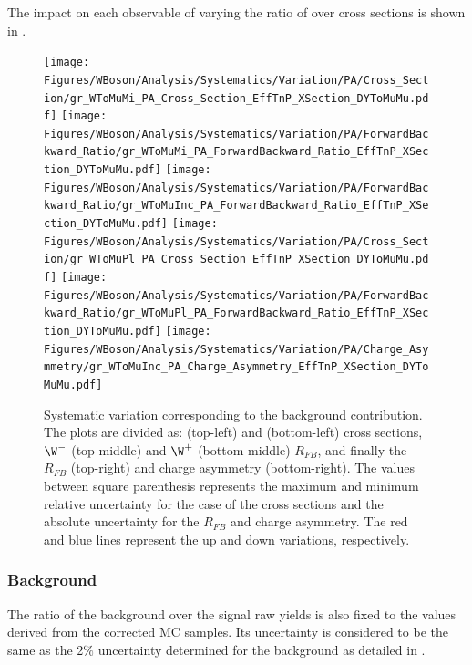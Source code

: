 The impact on each observable of varying the ratio of \DYToMuMu over \WToMuNu cross sections is shown in .

\begin{figure}[htbp]
 \begin{center}
  \texttt{[image: Figures/WBoson/Analysis/Systematics/Variation/PA/Cross\_Section/gr\_WToMuMi\_PA\_Cross\_Section\_EffTnP\_XSection\_DYToMuMu.pdf]}
  \texttt{[image: Figures/WBoson/Analysis/Systematics/Variation/PA/ForwardBackward\_Ratio/gr\_WToMuMi\_PA\_ForwardBackward\_Ratio\_EffTnP\_XSection\_DYToMuMu.pdf]}
  \texttt{[image: Figures/WBoson/Analysis/Systematics/Variation/PA/ForwardBackward\_Ratio/gr\_WToMuInc\_PA\_ForwardBackward\_Ratio\_EffTnP\_XSection\_DYToMuMu.pdf]}
  \texttt{[image: Figures/WBoson/Analysis/Systematics/Variation/PA/Cross\_Section/gr\_WToMuPl\_PA\_Cross\_Section\_EffTnP\_XSection\_DYToMuMu.pdf]}
  \texttt{[image: Figures/WBoson/Analysis/Systematics/Variation/PA/ForwardBackward\_Ratio/gr\_WToMuPl\_PA\_ForwardBackward\_Ratio\_EffTnP\_XSection\_DYToMuMu.pdf]}
  \texttt{[image: Figures/WBoson/Analysis/Systematics/Variation/PA/Charge\_Asymmetry/gr\_WToMuInc\_PA\_Charge\_Asymmetry\_EffTnP\_XSection\_DYToMuMu.pdf]}
 \end{center}
 \caption{Systematic variation corresponding to the \DYToMuMu background contribution. The plots are divided as: \WToMuNuMi (top-left) and \WToMuNuPl (bottom-left) cross sections, $\W^{-}$ (top-middle) and $\W^{+}$ (bottom-middle) $R_{FB}$, and finally the \W $R_{FB}$ (top-right) and \W charge asymmetry (bottom-right). The values between square parenthesis represents the maximum and minimum relative uncertainty for the case of the cross sections and the absolute uncertainty for the $R_{FB}$ and charge asymmetry. The red and blue lines represent the up and down variations, respectively.}
 \label{fig:Systematic_DYToMuMu}
\end{figure}

\clearpage
\subsubsection{\texorpdfstring{\DYToTauTau}\ Background}

The ratio of the \DYToTauTau background over the signal raw yields is also fixed to the values derived from the corrected MC samples. Its uncertainty is considered to be the same as the 2$\%$ uncertainty determined for the \DYToMuMu background as detailed in .

